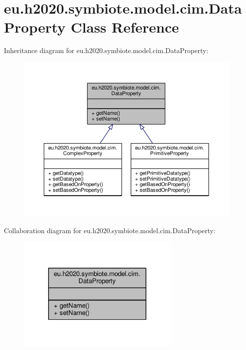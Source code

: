 \hypertarget{classeu_1_1h2020_1_1symbiote_1_1model_1_1cim_1_1DataProperty}{}\section{eu.\+h2020.\+symbiote.\+model.\+cim.\+Data\+Property Class Reference}
\label{classeu_1_1h2020_1_1symbiote_1_1model_1_1cim_1_1DataProperty}


Inheritance diagram for eu.\+h2020.\+symbiote.\+model.\+cim.\+Data\+Property\+:\nopagebreak
\begin{figure}[H]
\begin{center}
\leavevmode
\includegraphics[width=350pt]{classeu_1_1h2020_1_1symbiote_1_1model_1_1cim_1_1DataProperty__inherit__graph}
\end{center}
\end{figure}


Collaboration diagram for eu.\+h2020.\+symbiote.\+model.\+cim.\+Data\+Property\+:\nopagebreak
\begin{figure}[H]
\begin{center}
\leavevmode
\includegraphics[width=228pt]{classeu_1_1h2020_1_1symbiote_1_1model_1_1cim_1_1DataProperty__coll__graph}
\end{center}
\end{figure}
